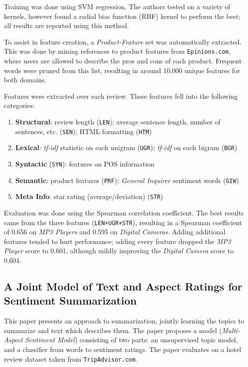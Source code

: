 \documentclass[letter,12pt]{article}
\begin{document}
Training was done using SVM regression.
The authors tested on a variety of kernels, however found a radial bias function (RBF)
	kernel to perform the best; all results are reported using this method.

To assist in feature creation, a {\em Product-Feature} set was automatically extracted.
This was done by mining references to product features from {\tt Epinions.com},
	where users are allowed to describe the pros and cons of each product.
Frequent words were pruned from this list, resulting in around 10,000 unique features
	for both domains.

Features were extracted over each review.
These features fell into the following categories:
\begin{enumerate}
	\item {\bf Structural}: review length ({\tt LEN}); average sentence length, 
		number of sentences, etc. ({\tt SEN}); 
		HTML formatting ({\tt HTM})
	\item {\bf Lexical}: {\it tf-idf} statistic on each unigram ({\tt UGR});
		{\it tf-idf} on each bigram ({\tt BGR})
	\item {\bf Syntactic} ({\tt SYN}): features on POS information
	\item {\bf Semantic}: product features ({\tt PRF}); 
		{\it General Inquirer} sentiment words ({\tt GIW}) 
	\item {\bf Meta Info}: star rating (average/deviation) ({\tt STR})
\end{enumerate}

Evaluation was done using the Spearman correlation coefficient.
The best results came from the three features ({\tt LEN+UGR+STR}),
	resulting in a Spearman coefficient of 0.656 on {\em MP3 Players}
	and 0.595 on {\em Digital Cameras}.
Adding additional features tended to hurt performance; adding every feature
	dropped the {\em MP3 Player} score to 0.601,
	although mildly improving the {\em Digital Camera} score to 0.604.

\subsection{A Joint Model of Text and Aspect Ratings for Sentiment Summarization \cite{2008titov-summarization}}

This paper presents an approach to summarization, jointly learning the topics to summarize and text which
	describes them.
The paper proposes a model ({\em Multi-Aspect Sentiment Model}) consisting of two parts: 
	an unsupervised topic model, and a classifier from words to sentiment ratings.
The paper evaluates on a hotel review dataset taken from {\tt TripAdvisor.com}.
\end{document}
